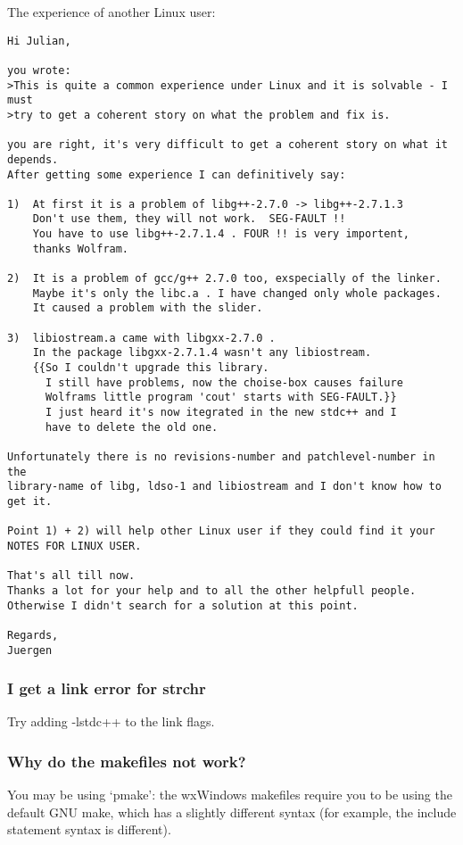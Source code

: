 The experience of another Linux user:

\begin{verbatim}
Hi Julian,

you wrote:
>This is quite a common experience under Linux and it is solvable - I must 
>try to get a coherent story on what the problem and fix is.

you are right, it's very difficult to get a coherent story on what it depends.
After getting some experience I can definitively say:

1) 	At first it is a problem of libg++-2.7.0 -> libg++-2.7.1.3
	Don't use them, they will not work.  SEG-FAULT !!
	You have to use libg++-2.7.1.4 . FOUR !! is very importent, 
	thanks Wolfram.

2)	It is a problem of gcc/g++ 2.7.0 too, exspecially of the linker.
	Maybe it's only the libc.a . I have changed only whole packages.
	It caused a problem with the slider.

3)	libiostream.a came with libgxx-2.7.0 .
	In the package libgxx-2.7.1.4 wasn't any libiostream.
	{{So I couldn't upgrade this library. 
	  I still have problems, now the choise-box causes failure
	  Wolframs little program 'cout' starts with SEG-FAULT.}}
	  I just heard it's now itegrated in the new stdc++ and I
	  have to delete the old one.

Unfortunately there is no revisions-number and patchlevel-number in the
library-name of libg, ldso-1 and libiostream and I don't know how to get it.

Point 1) + 2) will help other Linux user if they could find it your 
NOTES FOR LINUX USER.

That's all till now.
Thanks a lot for your help and to all the other helpfull people. 
Otherwise I didn't search for a solution at this point.

Regards,
Juergen
\end{verbatim}

\subsubsection{I get a link error for strchr}

Try adding -lstdc++ to the link flags.

\subsubsection{Why do the makefiles not work?}

You may be using `pmake': the wxWindows makefiles
require you to be using the default GNU make, which has
a slightly different syntax (for example, the include
statement syntax is different).

